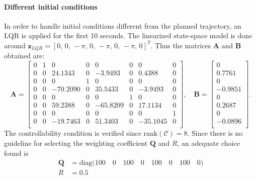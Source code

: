 \documentclass[a4paper,12pt]{article}
\begin{document}
\paragraph{Different initial conditions}
In order to handle initial conditions different from the planned trajectory, an LQR is applied for the first 10 seconds. The linearized state-space model is done around $\mathbf{z}_{LQR}=[0,\,0,\,-\pi,\, 0,\, -\pi,\,0,\,-\pi,\,0]^T$. Thus the matrices $\mathbf{A}$ and $\mathbf{B}$ obtained are:
\begin{equation}
\mathbf{A} = 
\begin{bmatrix}
 0 & 1 &        0 & 0 &        0 &      0 &        0 &      0 \\
 0 & 0 &  24.1343 & 0 &  -3.9493 &      0 &   0.4388 &      0 \\
 0 & 0 &        0 & 1 &        0 &      0 &        0 &      0 \\
 0 & 0 & -70.2090 &      0 &  35.5433 &      0 &  -3.9493 &      0 \\
 0 & 0 &        0 &      0 &        0 & 1 &        0 &      0 \\
 0 & 0 &  59.2388 &      0 & -65.8209 &      0 &  17.1134 &      0 \\
 0 & 0 &        0 &      0 &        0 &      0 &        0 & 1 \\
 0 & 0 & -19.7463 &      0 &  51.3403 &      0 & -35.1045 &      0 \\
\end{bmatrix},\quad
\mathbf{B} =
\begin{bmatrix}
     0\\
0.7761\\
     0\\
-0.9851\\
     0\\
0.2687\\
     0\\
-0.0896\\
\end{bmatrix}.
\end{equation}
The controllability condition is verified since $\text{rank}(\mathcal{C})=8$.
Since there is no guideline for selecting the weighting coefficient $\mathbf{Q}$ and $R$, an adequate choice found is
\begin{equation}
\begin{split}
\mathbf{Q}&=\text{diag}\big(100\quad0\quad100\quad0\quad100\quad0\quad100\quad0\big)\\
R&=0.5
\end{split}
\end{equation}
\end{document}
